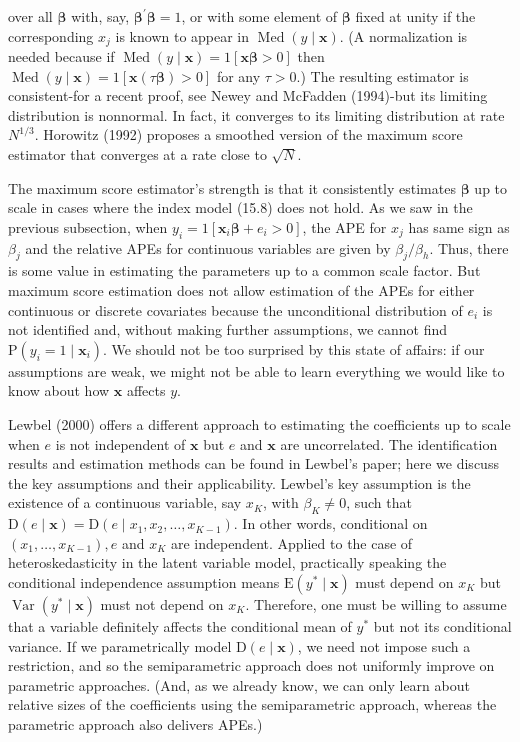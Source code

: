 \documentclass[10pt]{article}
\begin{document}
over all $\boldsymbol{\beta}$ with, say, $\boldsymbol{\beta}^{\prime} \boldsymbol{\beta}=1$, or with some element of $\boldsymbol{\beta}$ fixed at unity if the corresponding $x_{j}$ is known to appear in $\operatorname{Med}(y \mid \mathbf{x})$. (A normalization is needed because if $\operatorname{Med}(y \mid \mathbf{x})=1[\mathbf{x} \boldsymbol{\beta}>0]$ then $\operatorname{Med}(y \mid \mathbf{x})=1[\mathbf{x}(\tau \boldsymbol{\beta})>0]$ for any $\tau>0$.) The resulting estimator is consistent-for a recent proof, see Newey and McFadden (1994)-but its limiting distribution is nonnormal. In fact, it converges to its limiting distribution at rate $N^{1 / 3}$. Horowitz (1992) proposes a smoothed version of the maximum score estimator that converges at a rate close to $\sqrt{N}$.

The maximum score estimator's strength is that it consistently estimates $\boldsymbol{\beta}$ up to scale in cases where the index model (15.8) does not hold. As we saw in the previous subsection, when $y_{i}=1\left[\mathbf{x}_{i} \boldsymbol{\beta}+e_{i}>0\right]$, the APE for $x_{j}$ has same sign as $\beta_{j}$ and the relative APEs for continuous variables are given by $\beta_{j} / \beta_{h}$. Thus, there is some value in estimating the parameters up to a common scale factor. But maximum score estimation does not allow estimation of the APEs for either continuous or discrete covariates because the unconditional distribution of $e_{i}$ is not identified and, without making further assumptions, we cannot find $\mathrm{P}\left(y_{i}=1 \mid \mathbf{x}_{i}\right)$. We should not be too surprised by this state of affairs: if our assumptions are weak, we might not be able to learn everything we would like to know about how $\mathbf{x}$ affects $y$.

Lewbel (2000) offers a different approach to estimating the coefficients up to scale when $e$ is not independent of $\mathbf{x}$ but $e$ and $\mathbf{x}$ are uncorrelated. The identification results and estimation methods can be found in Lewbel's paper; here we discuss the key assumptions and their applicability. Lewbel's key assumption is the existence of a continuous variable, say $x_{K}$, with $\beta_{K} \neq 0$, such that $\mathrm{D}(e \mid \mathbf{x})=\mathrm{D}\left(e \mid x_{1}, x_{2}, \ldots, x_{K-1}\right)$. In other words, conditional on $\left(x_{1}, \ldots, x_{K-1}\right), e$ and $x_{K}$ are independent. Applied to the case of heteroskedasticity in the latent variable model, practically speaking the conditional independence assumption means $\mathrm{E}\left(y^{*} \mid \mathbf{x}\right)$ must depend on $x_{K}$ but $\operatorname{Var}\left(y^{*} \mid \mathbf{x}\right)$ must not depend on $x_{K}$. Therefore, one must be willing to assume that a variable definitely affects the conditional mean of $y^{*}$ but not its conditional variance. If we parametrically model $\mathrm{D}(e \mid \mathbf{x})$, we need not impose such a restriction, and so the semiparametric approach does not uniformly improve on parametric approaches. (And, as we already know, we can only learn about relative sizes of the coefficients using the semiparametric approach, whereas the parametric approach also delivers APEs.)
\end{document}
